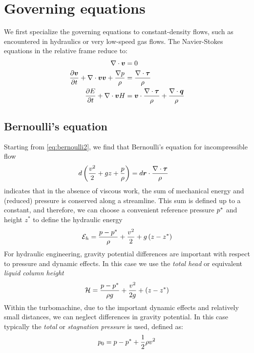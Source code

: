\section{Governing equations}
\label{sec:hydraulics:governing}

We first specialize the governing equations to constant-density flows,
such as encountered in hydraulics or very low-speed gas flows. The
Navier-Stokes equations in the relative frame reduce to:
\begin{align*}
  \nabla \cdot \boldsymbol {v} &= 0 \\
  \frac{\partial \boldsymbol {v}}{\partial t} 
  + \nabla \cdot \boldsymbol {v} \boldsymbol {v} 
  + \frac{\nabla p}{\rho}  &= 
  \frac{\nabla \cdot \boldsymbol {\tau}}{\rho} \\
  \frac{\partial E}{\partial t} 
  + \nabla \cdot \boldsymbol {v} H 
  &= \boldsymbol {v} \cdot \frac{\nabla \cdot \boldsymbol {\tau}}{\rho} 
  + \frac{\nabla \cdot \boldsymbol {q}}{\rho}
\end{align*}

\subsection{Bernoulli's equation}

Starting from \ref{eq:bernoulli2}, we find that Bernoulli's equation
for incompressible flow
\begin{align*}
  d \left(\frac{v^2}{2} + g z + \frac{p}{\rho} \right) &=
  d\boldsymbol {r} \cdot \frac{\nabla \cdot \boldsymbol {\tau}}{\rho}
\end{align*}
indicates that in the absence of viscous work, the sum of mechanical
energy and (reduced) pressure is conserved along a streamline. This
sum is defined up to a constant, and therefore, we can choose a
convenient reference pressure $p^\ast$ and height $z^\ast$ to
define the hydraulic energy
\begin{align*}
  \mathcal E_h = \frac{p - p^\ast}{\rho} + \frac{v^2}{2} + g
  \left(z - z^\ast\right)
\end{align*}
For hydraulic engineering, gravity potential differences are important
with respect to pressure and dynamic effects. In this case we use the
\emph{total head} or equivalent \emph{liquid column height}
\begin{align}
  \mathcal H = \frac{p - p^\ast}{\rho g} + \frac{v^2}{2
    g} + \left(z - z^\ast\right)
  \label{eq:hydraulicEnergy}
\end{align}
Within the turbomachine, due to the important dynamic effects and
relatively small distances, we can neglect differences in gravity
potential. In this case typically the \emph{total} or \emph{stagnation
  pressure} is used, defined as:
\begin{align*}
  p_{0} = p - p^\ast + \frac{1}{2} \rho v^2
\end{align*}

